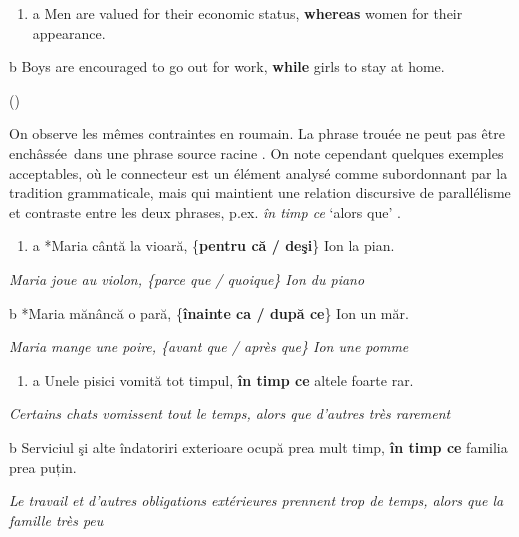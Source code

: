 \begin{enumerate}
\item \label{bkm:Ref289077590}a   Men are valued for their economic status, \textbf{whereas} women for their appearance.


\end{enumerate}
b  Boys are encouraged to go out for work, \textbf{while} girls to stay at home. 

{\raggedleft
(\citet[654]{Izutsu2008})
}

On observe les mêmes contraintes en roumain. La phrase trouée ne peut pas être enchâssée~dans une phrase source racine . On note cependant quelques exemples acceptables, où le connecteur est un élément analysé comme subordonnant par la tradition grammaticale, mais qui maintient une relation discursive de parallélisme et contraste entre les deux phrases, p.ex. \textit{în timp ce} `alors que' .~


\begin{enumerate}
\item \label{bkm:Ref289080977}a  *Maria cântă la vioară, \{\textbf{pentru că / deşi}\} Ion la pian.


\end{enumerate}
{\itshape
Maria joue au violon, \{parce que / quoique\} Ion du piano  } 

  b  *Maria mănâncă o pară, \{\textbf{înainte ca / după ce}\} Ion un măr.

{\itshape
Maria mange une poire, \{avant que / après que\} Ion une pomme} 


\begin{enumerate}
\item \label{bkm:Ref289081035}a  Unele pisici vomită tot timpul, \textbf{în timp ce} altele foarte rar.


\end{enumerate}
{\itshape
Certains chats vomissent tout le temps, alors que d'autres très rarement  } 

  b  Serviciul şi alte îndatoriri exterioare ocupă prea mult timp, \textbf{în timp ce} familia prea puțin.

{\itshape
Le travail et d'autres obligations extérieures prennent trop de temps, alors que la famille très peu} 

